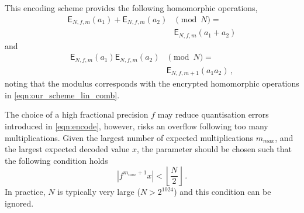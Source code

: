 \documentclass[twocolumn]{autart}
\begin{document}
This encoding scheme provides the following homomorphic operations,
\begin{equation}
    \begin{split}
        \mathsf{E}_{N,f,m}(a_1) + \mathsf{E}_{N,f,m}(a_2)& \pmod{N} =\\
        &\mathsf{E}_{N,f,m}(a_1+a_2)
    \end{split}
\end{equation}
and
\begin{equation}
    \begin{split}
        \mathsf{E}_{N,f,m}(a_1)\mathsf{E}_{N,f,m}(a_2)& \pmod{N} =\\
        &\mathsf{E}_{N,f,m+1}(a_1a_2)\,,
    \end{split}
\end{equation}
noting that the modulus corresponds with the encrypted homomorphic operations in \eqref{eqn:our_scheme_lin_comb}.

The choice of a high fractional precision $f$ may reduce quantisation errors introduced in \eqref{eqn:encode}, however, risks an overflow following too many multiplications. Given the largest number of expected multiplications $m_{max}$, and the largest expected decoded value $x$, the parameter should be chosen such that the following condition holds
\begin{equation*}
    \left|f^{m_{max}+1}x\right| < \left\lfloor \frac{N}{2} \right\rfloor\,.
\end{equation*}
In practice, $N$ is typically very large ($N>2^{1024}$) and this condition can be ignored.

% 
% 
\end{document}

